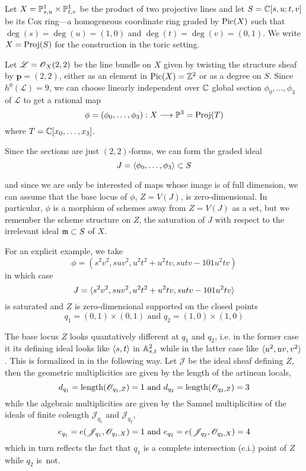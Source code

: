 \documentclass[fleqn,reqno]{amsart}
\numberwithin{first}{chapter}
\begin{document}
\begin{example}[$\mt{ex203}$]
\label{ex203}
Let $X=\PP^1_{s,u}\times\PP^1_{t,v}$ be the product of two projective lines and let $S=\CC[s,u;t,v]$
be its Cox ring---a homogeneous coordinate ring graded by $\Pic(X)$ such that $\deg(s)=\deg(u)=(1,0)$
and $\deg(t)=\deg(v)=(0,1)$.
We write $X=\Proj(S)$ for the construction in the toric setting.

Let $\mathscr{L}=\O_X(2,2)$ be the line bundle on $X$ given by twisting the structure sheaf by
$\mathbf p=(2,2)$, either as an element in $\Pic(X)=\ZZ^2$ or as a degree on $S$.
Since $h^0(\mathscr{L})=9$, we can choose  linearly independent over $\CC$
global section $\phi_0,\ldots,\phi_3$ of $\mathscr{L}$ to get a rational map
\[
	\phi=(\phi_0,\ldots,\phi_3):X\To\PP^3=\Proj(T)
\]
where $T=\CC[x_0,\ldots,x_3]$.

Since the sections are just $(2,2)$-forms, we can form the graded ideal
\[
	J=\la \phi_0,\ldots,\phi_3\ra\se S
\]

and since we are only be interested of maps whose image is of full dimension,
we can assume that the base locus of $\phi$, $Z=V(J)$, is zero-dimensional.
In particular, $\phi$ is a morphism of schemes away from $Z=V(J)$ as a set,
but we remember the scheme structure on $Z$,
the saturation of $J$ with respect to the irrelevant ideal $\m\se S$ of $X$.

For an explicit example, we take
\[
	\phi=(s^{2} v^{2},s u v^{2},u^{2} t^{2}+u^{2} t v,s u t v-101 u^{2}t v)
\]
in which case
\[
	J=\la s^{2} v^{2},s u v^{2},u^{2} t^{2}+u^{2} t v,s u t v-101 u^{2}t v\ra
\]
is saturated and $Z$ is zero-dimensional supported on the closed points
\[
	q_1=(0,1)\times(0,1) \text{ and } q_2=(1,0)\times(1,0)
\]

The base locus $Z$ looks quantatively different at $q_1$ and $q_2$, i.e.
in the former case it its defining ideal looks like $\la s,t\ra$ in $\AA^2_{s,t}$
while in the latter case like $\la u^2,uv,v^2\ra$.
This is formalized in in the following way.
Let $\mathscr{J}$ be the ideal sheaf defining $Z$,
then the geometric multiplicities are given by the length of the artinean locals,
\[
	d_{q_1}=\length(\O_{q_1,Z})=1 \text{ and } d_{q_2}=\length(\O_{q_2,Z})=3
\]
while the algebraic multiplicities are given by the Samuel multiplicities
of the ideals of finite colength $\mathscr{J}_{q_1}$ and $\mathscr{J}_{q_2}$,
\[
	e_{q_1}=e(\mathscr{J}_{q_1},\O_{q_1,X})=1 \text{ and } e_{q_2}=e(\mathscr{J}_{q_2},\O_{q_2,X})=4
\]
which in turn reflects the fact that $q_1$ is a complete intersection (c.i.) point of $Z$
while $q_2$ is~not.


\end{example}
\end{document}

